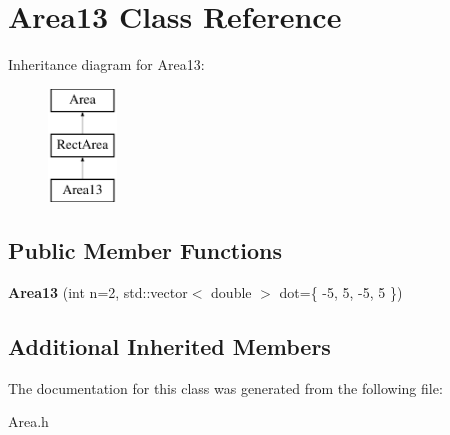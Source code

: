 \hypertarget{class_area13}{}\section{Area13 Class Reference}
\label{class_area13}
Inheritance diagram for Area13\+:\begin{figure}[H]
\begin{center}
\leavevmode
\includegraphics[height=3.000000cm]{class_area13}
\end{center}
\end{figure}
\subsection*{Public Member Functions}
\begin{DoxyCompactItemize}
\item 
\mbox{\label{class_area13_ac4fc316009b697bb551bd816078564c9}} 
{\bfseries Area13} (int n=2, std\+::vector$<$ double $>$ dot=\{ -\/5, 5, -\/5, 5 \})
\end{DoxyCompactItemize}
\subsection*{Additional Inherited Members}


The documentation for this class was generated from the following file\+:\begin{DoxyCompactItemize}
\item 
Area.\+h\end{DoxyCompactItemize}
